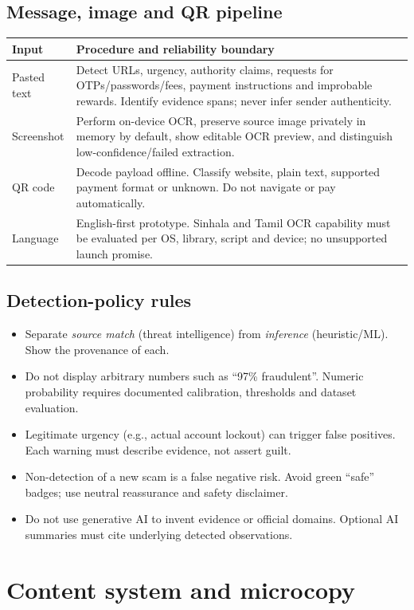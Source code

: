 \documentclass[10pt,a4paper]{article}
\begin{document}
\subsection{Message, image and QR pipeline}
\begin{tabularx}{\linewidth}{@{}p{31mm}Y@{}}\toprule
\textbf{Input} & \textbf{Procedure and reliability boundary} \\ \midrule
Pasted text & Detect URLs, urgency, authority claims, requests for OTPs/passwords/fees, payment instructions and improbable rewards. Identify evidence spans; never infer sender authenticity. \\
Screenshot & Perform on-device OCR, preserve source image privately in memory by default, show editable OCR preview, and distinguish low-confidence/failed extraction. \\
QR code & Decode payload offline. Classify website, plain text, supported payment format or unknown. Do not navigate or pay automatically. \\
Language & English-first prototype. Sinhala and Tamil OCR capability must be evaluated per OS, library, script and device; no unsupported launch promise. \\
\bottomrule\end{tabularx}

\subsection{Detection-policy rules}
\begin{itemize}
\item Separate \emph{source match} (threat intelligence) from \emph{inference} (heuristic/ML). Show the provenance of each.
\item Do not display arbitrary numbers such as ``97\% fraudulent''. Numeric probability requires documented calibration, thresholds and dataset evaluation.
\item Legitimate urgency (e.g., actual account lockout) can trigger false positives. Each warning must describe evidence, not assert guilt.
\item Non-detection of a new scam is a false negative risk. Avoid green ``safe'' badges; use neutral reassurance and safety disclaimer.
\item Do not use generative AI to invent evidence or official domains. Optional AI summaries must cite underlying detected observations.
\end{itemize}

\section{Content system and microcopy}
\end{document}
